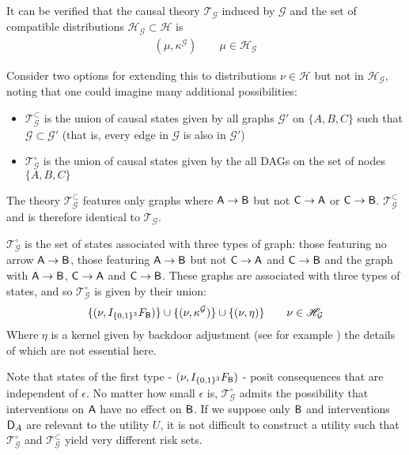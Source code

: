 \begin{example}
It can be verified that the causal theory $\mathscr{T}_{\mathcal{G}}$ induced by $\mathcal{G}$ and the set of compatible distributions $\mathscr{H}_\mathcal{G}\subset\mathscr{H}$ is
\begin{align}
    (\mu,\kappa^{\mathcal{G}} ) \qquad \mu\in \mathscr{H}_{\mathcal{G}} \label{eq:ocbn}
\end{align}

Consider two options for extending this to distributions $\nu\in \mathscr{H}$ but not in $\mathscr{H}_{\mathcal{G}}$, noting that one could imagine many additional possibilities:
\begin{itemize}
    \item $\mathscr{T}_{\mathcal{G}}^\subset$ is the union of causal states given by all graphs $\mathcal{G}'$ on $\{A, B, C\}$ such that $\mathcal{G}\subset \mathcal{G}'$ (that is, every edge in $\mathcal{G}$ is also in $\mathcal{G}'$)
    \item $\mathscr{T}_{\mathcal{G}}^\circ$ is the union of causal states given by the all DAGs on the set of nodes $\{A, B, C\}$
\end{itemize}

The theory $\mathscr{T}_{\mathcal{G}}^\subset$ features only graphs where $\mathsf{A}\to \mathsf{B}$ but not $\mathsf{C}\to\mathsf{A}$ or $\mathsf{C}\to \mathsf{B}$. $\mathscr{T}_{\mathcal{G}}^\subset$ and is therefore identical to $\mathscr{T}_\mathcal{G}$.

$\mathscr{T}_{\mathcal{G}}^\circ$ is the set of states associated with three types of graph: those featuring no arrow $\mathsf{A}\to\mathsf{B}$, those featuring $\mathsf{A}\to \mathsf{B}$ but not $\mathsf{C}\to\mathsf{A}$ and $\mathsf{C}\to \mathsf{B}$ and the graph with $\mathsf{A}\to \mathsf{B}$, $\mathsf{C}\to \mathsf{A}$ and $\mathsf{C}\to \mathsf{B}$. These graphs are associated with three types of states, and so $\mathscr{T}_{\mathcal{G}}^\circ$ is given by their union:
\begin{align}
    \{(\nu,I_{\{0,1\}^3} F_{\mathsf{B}})\} \cup \{(\nu,\kappa^\mathcal{G})\} \cup \{(\nu,\eta) \}\qquad \nu\in \mathscr{H}_{\mathcal{G}}
\end{align}
Where $\eta$ is a kernel given by backdoor adjustment (see for example \cite{maathuis_estimating_2009}) the details of which are not essential here. 

Note that states of the first type - $(\nu,I_{\{0,1\}^3} F_{\mathsf{B}})$ - posit consequences that are independent of $\epsilon$. No matter how small $\epsilon$ is, $\mathscr{T}_{\mathcal{G}}^\circ$ admits the possibility that interventions on $\mathsf{A}$ have no effect on $\mathsf{B}$. If we suppose only $\mathsf{B}$ and interventions $\mathsf{D}_A$ are relevant to the utility $U$, it is not difficult to construct a utility such that $\mathscr{T}_{\mathcal{G}}^\circ$ and $\mathscr{T}_{\mathcal{G}}^\subset$ yield very different risk sets.


\end{example}

